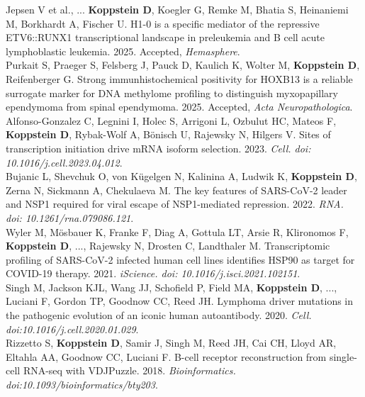 \documentclass[10pt,a4paper]{article}
\begin{document}
{\noindent Jepsen V et al., ... \textbf{Koppstein D}, Koegler G, Remke M, Bhatia S, Heinaniemi M, Borkhardt A, Fischer U. H1-0 is a specific mediator of the repressive ETV6::RUNX1 transcriptional landscape in preleukemia and B cell acute lymphoblastic leukemia. 2025. Accepted, \textit{Hemasphere}. \vspace{0.5em} \\ 
{\noindent Purkait S, Praeger S, Felsberg J, Pauck D, Kaulich K, Wolter M, \textbf{Koppstein D}, Reifenberger G. Strong immunhistochemical positivity for HOXB13 is a reliable surrogate marker for DNA methylome profiling to distinguish myxopapillary ependymoma from spinal ependymoma. 2025. Accepted, \textit{Acta Neuropathologica}. \vspace{0.5em} \\ 
{\noindent Alfonso-Gonzalez C, Legnini I, Holec S, Arrigoni L, Ozbulut HC, Mateos F, \textbf{Koppstein D}, Rybak-Wolf A, Bönisch U, Rajewsky N, Hilgers V. Sites of transcription initiation drive mRNA isoform selection. 2023. \textit{Cell. doi: 10.1016/j.cell.2023.04.012}. \vspace{0.5em} \\ 
{\noindent Bujanic L, Shevchuk O, von Kügelgen N, Kalinina A, Ludwik K, \textbf{Koppstein D}, Zerna N, Sickmann A, Chekulaeva M. The key features of SARS-CoV-2 leader and NSP1 required for viral escape of NSP1-mediated repression. 2022. \textit{RNA. doi: 10.1261/rna.079086.121}. \vspace{0.5em} \\ 
{\noindent Wyler M, Mösbauer K, Franke F, Diag A, Gottula LT, Arsie R, Klironomos F, \textbf{Koppstein D}, ..., Rajewsky N, Drosten C, Landthaler M. Transcriptomic profiling of SARS-CoV-2 infected human cell lines identifies HSP90 as target for COVID-19 therapy. 2021. \textit{iScience. doi: 10.1016/j.isci.2021.102151}. \vspace{0.5em} \\
{\noindent Singh M, Jackson KJL, Wang JJ, Schofield P, Field MA, \textbf{Koppstein D}, ..., Luciani F, Gordon TP, Goodnow CC, Reed JH. Lymphoma driver mutations in the pathogenic evolution of an iconic human autoantibody. 2020. \textit{Cell. doi:10.1016/j.cell.2020.01.029}. \vspace{0.5em} \\
{\noindent Rizzetto S, \textbf{Koppstein D}, Samir J, Singh M, Reed JH, Cai CH, Lloyd AR, Eltahla AA, Goodnow CC, Luciani F. B-cell receptor reconstruction from single-cell RNA-seq with VDJPuzzle. 2018. \textit{Bioinformatics. doi:10.1093/bioinformatics/bty203}. \vspace{0.5em} \\
}}}}}}}
\end{document}
